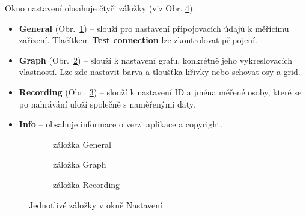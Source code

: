 Okno nastavení obsahuje čtyři záložky (viz Obr. \ref{fig:settings_cards}):
\begin{itemize}
    \item \textbf{General} (Obr.~\ref{fig:settings_general}) -- slouží pro
          nastavení připojovacích údajů k měřícímu zařízení. Tlačítkem \textbf{Test
              connection} lze zkontrolovat připojení.
    \item \textbf{Graph} (Obr.~\ref{fig:settings_graph}) -- slouží k nastavení
          grafu, konkrétně jeho vykreslovacích vlastností. Lze zde nastavit barva a
          tloušťka křivky nebo schovat osy a grid.
    \item \textbf{Recording} (Obr.~\ref{fig:settings_recording}) -- slouží k
          nastavení ID a jména měřené osoby, které se po nahrávání uloží
          společně s naměřenými daty.
    \item \textbf{Info} -- obsahuje informace o verzi aplikace a copyright.
\end{itemize}

\begin{figure}[h]
    \centering
    \begin{subfigure}[b]{0.3\textwidth}
        \centering
        \textcolor{cyan}{\fboxrule=0.5pt\fboxsep=0pt}
        \caption{záložka General}
        \label{fig:settings_general}
    \end{subfigure}
    \hfill
    \begin{subfigure}[b]{0.3\textwidth}
        \centering
        \textcolor{cyan}{\fboxrule=0.5pt\fboxsep=0pt}
        \caption{záložka Graph}
        \label{fig:settings_graph}
    \end{subfigure}
    \hfill
    \begin{subfigure}[b]{0.3\textwidth}
        \centering
        \textcolor{cyan}{\fboxrule=0.5pt\fboxsep=0pt}
        \caption{záložka Recording}
        \label{fig:settings_recording}
    \end{subfigure}
    \caption{Jednotlivé záložky v okně Nastavení}
    \label{fig:settings_cards}
\end{figure}


